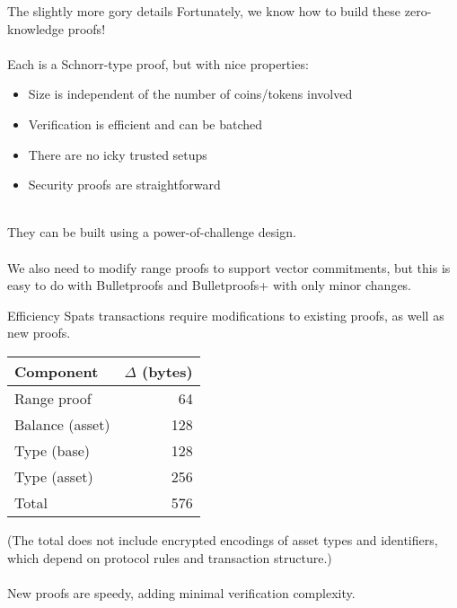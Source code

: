 \documentclass[aspectratio=169]{beamer}
\begin{document}
\begin{frame}{The slightly more gory details}
	Fortunately, we know how to build these zero-knowledge proofs! \\~\\

	Each is a Schnorr-type proof, but with nice properties:
	\begin{itemize}
		\item Size is independent of the number of coins/tokens involved
		\item Verification is efficient and can be batched
		\item There are no icky trusted setups
		\item Security proofs are straightforward \\~\\
	\end{itemize}

	They can be built using a power-of-challenge design. \\~\\

	We also need to modify range proofs to support vector commitments, but this is easy to do with Bulletproofs and Bulletproofs+ with only minor changes.
\end{frame}

\begin{frame}{Efficiency}
	Spats transactions require modifications to existing proofs, as well as new proofs.

	\begin{center}
		\setlength{\tabcolsep}{20pt}
		\begin{tabular}{lr}
			\textbf{Component} & \textbf{$\Delta$ (bytes)} \\
			\hline
			Range proof & 64 \\
			Balance (asset) & 128 \\
			Type (base) & 128 \\
			Type (asset) & 256 \\
			\hline
			Total & 576
		\end{tabular}
	\end{center}

	(The total does not include encrypted encodings of asset types and identifiers, which depend on protocol rules and transaction structure.) \\~\\

	New proofs are speedy, adding minimal verification complexity.
\end{frame}
\end{document}
